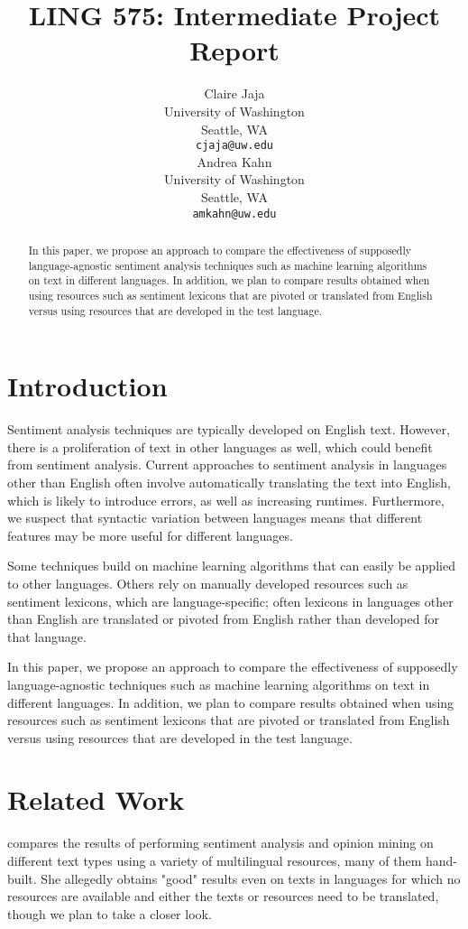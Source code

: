 \documentclass[11pt]{article}
\title{LING 575: Intermediate Project Report}
\author{Claire Jaja \\
  University of Washington \\
  Seattle, WA \\
  {\tt cjaja@uw.edu} \\\And
  Andrea Kahn \\
  University of Washington \\
  Seattle, WA \\
  {\tt amkahn@uw.edu} \\}
\date{}
\begin{document}
\maketitle
\begin{abstract}
In this paper, we propose an approach to compare the effectiveness of supposedly language-agnostic sentiment analysis techniques such as machine learning algorithms on text in different languages.  In addition, we plan to compare results obtained when using resources such as sentiment lexicons that are pivoted or translated from English versus using resources that are developed in the test language.
\end{abstract}

\section{Introduction}

Sentiment analysis techniques are typically developed on English text.  However, there is a proliferation of text in other languages as well, which could benefit from sentiment analysis.  Current approaches to sentiment analysis in languages other than English often involve automatically translating the text into English, which is likely to introduce errors, as well as increasing runtimes.  Furthermore, we suspect that syntactic variation between languages means that different features may be more useful for different languages.

Some techniques build on machine learning algorithms that can easily be applied to other languages.  Others rely on manually developed resources such as sentiment lexicons, which are language-specific; often lexicons in languages other than English are translated or pivoted from English rather than developed for that language.

In this paper, we propose an approach to compare the effectiveness of supposedly language-agnostic techniques such as machine learning algorithms on text in different languages.  In addition, we plan to compare results obtained when using resources such as sentiment lexicons that are pivoted or translated from English versus using resources that are developed in the test language.

\section{Related Work}
 compares the results of performing sentiment analysis and opinion mining on different text types using a variety of multilingual resources, many of them hand-built.  She allegedly obtains "good" results even on texts in languages for which no resources are available and either the texts or resources need to be translated, though we plan to take a closer look.
\end{document}
